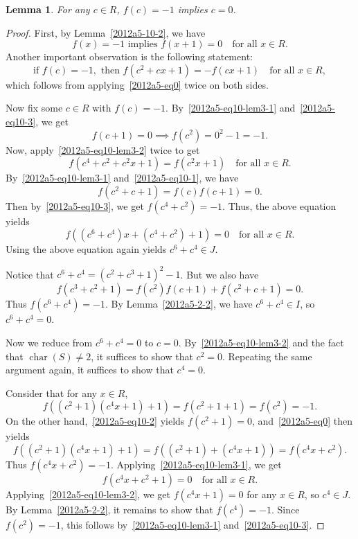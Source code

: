 \documentclass{article}
\DeclareMathOperator{\rchar}{char}
\newtheorem{lemma}{Lemma}
\begin{document}
\begin{lemma}\label{2012a5-10-3}
For any $c \in R$, $f(c) = -1$ implies $c = 0$.
\end{lemma}
\begin{proof}
First, by Lemma~\ref{2012a5-10-2}, we have
\[ f(x) = -1 \text{ implies } f(x + 1) = 0 \quad \text{for all } x \in R. \tag{10.L3.1}\label{2012a5-eq10-lem3-1} \]
Another important observation is the following statement:
\[ \text{if } f(c) = -1, \text{ then } f(c^2 + cx + 1) = -f(cx + 1) \quad \text{for all } x \in R, \tag{10.L3.2}\label{2012a5-eq10-lem3-2} \]
    which follows from applying~\eqref{2012a5-eq0} twice on both sides.

Now fix some $c \in R$ with $f(c) = -1$.
By~\eqref{2012a5-eq10-lem3-1} and~\eqref{2012a5-eq10-3}, we get
\[ f(c + 1) = 0 \implies f(c^2) = 0^2 - 1 = -1. \]
Now, apply~\eqref{2012a5-eq10-lem3-2} twice to get
\[ f(c^4 + c^2 + c^2 x + 1) = f(c^2 x + 1) \quad \text{for all } x \in R. \]
By~\eqref{2012a5-eq10-lem3-1} and~\eqref{2012a5-eq10-1}, we have
\[ f(c^2 + c + 1) = f(c) f(c + 1) = 0. \]
Then by~\eqref{2012a5-eq10-3}, we get $f(c^4 + c^2) = -1$.
Thus, the above equation yields
\[ f((c^6 + c^4) x + (c^4 + c^2) + 1) = 0 \quad \text{for all } x \in R. \]
Using the above equation again yields $c^6 + c^4 \in J$.

Notice that $c^6 + c^4 = (c^2 + c^3 + 1)^2 - 1$.
But we also have
\[ f(c^3 + c^2 + 1) = f(c^2) f(c + 1) + f(c^2 + c + 1) = 0. \]
Thus $f(c^6 + c^4) = -1$.
By Lemma~\ref{2012a5-2-2}, we have $c^6 + c^4 \in I$, so $c^6 + c^4 = 0$.

Now we reduce from $c^6 + c^4 = 0$ to $c = 0$.
By~\eqref{2012a5-eq10-lem3-2} and the fact that $\rchar(S) \neq 2$, it suffices to show that $c^2 = 0$.
Repeating the same argument again, it suffices to show that $c^4 = 0$.

Consider that for any $x \in R$,
\[ f((c^2 + 1)(c^4 x + 1) + 1) = f(c^2 + 1 + 1) = f(c^2) = -1. \]
On the other hand,~\eqref{2012a5-eq10-2} yields $f(c^2 + 1) = 0$, and~\eqref{2012a5-eq0} then yields
\[ f((c^2 + 1)(c^4 x + 1) + 1) = f((c^2 + 1) + (c^4 x + 1)) = f(c^4 x + c^2). \]
Thus $f(c^4 x + c^2) = -1$.
Applying~\eqref{2012a5-eq10-lem3-1}, we get
\[ f(c^4 x + c^2 + 1) = 0 \quad \text{for all } x \in R. \]
Applying~\eqref{2012a5-eq10-lem3-2}, we get $f(c^4 x + 1) = 0$ for any $x \in R$, so $c^4 \in J$.
By Lemma~\ref{2012a5-2-2}, it remains to show that $f(c^4) = -1$.
Since $f(c^2) = -1$, this follows by~\eqref{2012a5-eq10-lem3-1} and~\eqref{2012a5-eq10-3}.
\end{proof}
\end{document}
